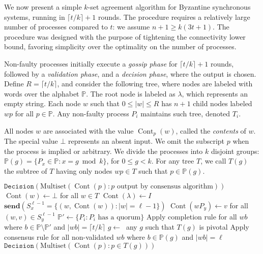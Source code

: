 \documentclass[11pt]{article}
\newcommand{\bbP}{\ensuremath{\mathbb{P}}}
\newcommand{\set}[1]{\{#1\}}
\newcommand{\send}[1]{\mathbf{send}({#1})}
\newcommand{\recv}[1]{\mathbf{recv}({#1})}
\DeclareMathOperator{\cont}{Cont}
\begin{document}
We now present a simple $k$-set agreement algorithm
for Byzantine synchronous systems,
running in $\lceil t/k \rceil + 1$ rounds.
The procedure requires a relatively large number of processes compared to $t$:
we assume $n + 1 \ge k(3t + 1)$.
The procedure was designed 
with the purpose of tightening the connectivity lower bound,
favoring simplicity over the optimality on the number of processes.

Non-faulty processes initially execute a \emph{gossip phase}
for $\lceil t/k \rceil + 1$ rounds,
followed by a \emph{validation phase},
and a \emph{decision phase},
where the output is chosen.
Define $R = \lceil t/k \rceil$,
and consider the following tree,
where nodes are labeled with words over the alphabet $\bbP$.
The root node is labeled as $\lambda$,
which represents an empty string.
Each node $w$ such that $0 \le |w| \le R$
has $n + 1$ child nodes labeled $wp$ for all $p \in \bbP$.
Any non-faulty process $P_i$ maintains such tree,
denoted $T_i$.

All nodes $w$ are associated with the value $\cont_p(w)$,
called the \emph{contents} of $w$.
The special value $\bot$ represents an absent input.
We omit the subscript $p$ when the process is implied or arbitrary.
We divide the processes into $k$ disjoint groups: $\bbP(g) = \set{P_x \in \bbP: x = g \bmod k}$,
for $0 \le g < k$.
For any tree $T$,
we call $T(g)$ the subtree of $T$ having only nodes $wp \in T$ such that $p \in \bbP(g)$.

\begin{algorithm}[htb]
\caption{$P_x.\mathrm{Agree}(I)$}
\label{Alg-Agree}
\begin{algorithmic}[1]
	\State \Return $\mathtt{Decision}(\mathrm{Multiset}(\cont(p): p \textrm{ output by consensus algorithm}))$
\EndIf
\State $\cont(w) \leftarrow \bot$ for all $w \in T$
\State $\cont(\lambda) \leftarrow I$ 
	\State $\send{S_x^{\ell-1} = \set{(w, \cont(w)): |w| = \ell - 1}}$
	\Upon{$\recv{S_y^{\ell-1} = \set{(w, v): |w| = \ell - 1, v \in V \cup \set{\bot}}}$ from $P_y$}
		\State $\cont(w P_y) \leftarrow v$ for all $(w, v) \in S_y^{\ell-1}$
	\EndUpon
\EndFor \label{algAgree:gossip}
\State $\bbP' \leftarrow \set{P_i: P_i \textrm{ has a quorum}}$ 
\If{$|\bbP'| = (n + 1) - t$}
	\State Apply completion rule for all $wb$ where $b \in \bbP \setminus \bbP'$ and $|wb| = \lceil t/k \rceil$
\EndIf
\State $g \leftarrow \ $ any $g$ such that $T(g)$ is pivotal \label{algAgree:dec1} 
	\State Apply consensus rule for all non-validated $wb$ where $b \in \bbP(g)$ and $|wb| = \ell$ \label{algAgree:dec2}
\EndFor
\State \Return $\mathtt{Decision}(\mathrm{Multiset}(\cont(p): p \in T(g)))$
\end{algorithmic}
\end{algorithm}
\end{document}
